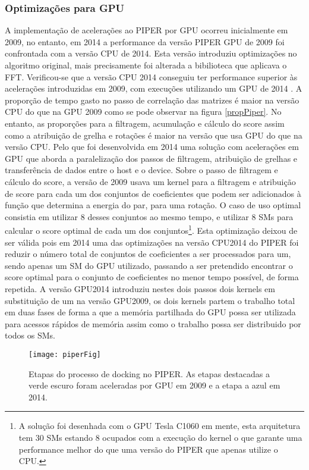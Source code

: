  \subsubsection{Optimizações para GPU}
 A implementação de acelerações ao PIPER\cite{piper2009gpu} por GPU ocorreu inicialmente em 2009, no entanto, em 2014 a performance da versão PIPER GPU de 2009 foi confrontada com a versão CPU de 2014. Esta versão introduziu optimizações no algoritmo original, mais precisamente foi alterada a bibilioteca que aplicava o FFT. Verificou-se que a versão CPU 2014 conseguiu ter performance superior às acelerações introduzidas em 2009, com execuções utilizando um GPU de 2014 \cite{piper2014gpu}. A proporção de tempo gasto no passo de correlação das matrizes é maior na versão CPU do que na GPU 2009 como se pode observar na figura \ref{propPiper}. No entanto, as proporções para a filtragem, acumulação e cálculo do score assim como a atribuição de grelha e rotações é maior na versão que usa GPU do que na versão CPU. Pelo que foi desenvolvida em 2014  uma solução com acelerações em GPU que aborda a paralelização dos passos de filtragem, atribuição de grelhas e transferência de dados entre o host e o device.
 Sobre o passo de filtragem e cálculo do score, a versão de 2009 usava um kernel para a filtragem e atribuição de score para cada um dos conjuntos de coeficientes que podem ser adicionados à função que determina a energia do par, para uma rotação. O caso de uso optimal consistia em utilizar 8 desses conjuntos ao mesmo tempo, e utilizar 8 SMs para calcular o score optimal de cada um dos conjuntos\footnote[5]{A solução foi desenhada com o GPU Tesla C1060 em mente, esta arquitetura tem 30 SMs estando 8 ocupados com a execução do kernel o que garante uma performance melhor do que uma versão do PIPER que apenas utilize o CPU.}. Esta optimização deixou de ser válida pois em 2014 uma das optimizações na versão CPU2014 do PIPER foi reduzir o número total de conjuntos de coeficientes a ser processados para um, sendo apenas um SM do GPU utilizado, passando a ser pretendido encontrar o score optimal para o conjunto de coeficientes no menor tempo possível, de forma repetida. A versão GPU2014 introduziu nestes dois passos dois kernels em substituição de um na versão GPU2009, os dois kernels partem o trabalho total em duas fases de forma a que a memória partilhada do GPU possa ser utilizada para acessos rápidos de memória assim como o trabalho possa ser distribuido por todos os SMs.
    \begin{figure}[ht]
  \centering
    {\texttt{[image: piperFig]}}
  \caption{Etapas do processo de docking no PIPER. As etapas destacadas a verde escuro foram aceleradas por GPU em 2009 e a etapa a azul em 2014. \cite{piper2014gpu} }
  \label{piperGPU}
\end{figure}

